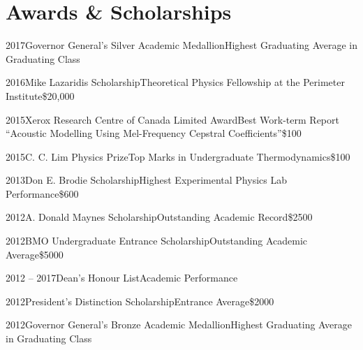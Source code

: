 \documentclass{article}
\begin{document}
    \section{Awards \& Scholarships}
    \begin{awardlist}
        \item{2017}{Governor General's Silver Academic Medallion}{Highest Graduating Average in Graduating Class}{}
        \item{2016}{Mike Lazaridis Scholarship}{Theoretical Physics Fellowship at the Perimeter Institute}{\$20,000}
        \item{2015}{Xerox Research Centre of Canada Limited Award}{Best Work-term Report ``Acoustic Modelling Using Mel-Frequency Cepstral Coefficients''}{\$100}
        \item{2015}{C. C. Lim Physics Prize}{Top Marks in Undergraduate Thermodynamics}{\$100}
        \item{2013}{Don E. Brodie Scholarship}{Highest Experimental Physics Lab Performance}{\$600}
        \item{2012}{A. Donald Maynes Scholarship}{Outstanding Academic Record}{\$2500}
        \item{2012}{BMO Undergraduate Entrance Scholarship}{Outstanding Academic Average}{\$5000}
        \item{2012 -- 2017}{Dean's Honour List}{Academic Performance}{}
        \item{2012}{President's Distinction Scholarship}{Entrance Average}{\$2000}
        \item{2012}{Governor General's Bronze Academic Medallion}{Highest Graduating Average in Graduating Class}{}
    \end{awardlist}
    \clearpage
\end{document}
